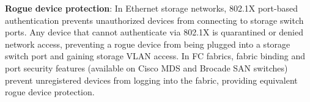 \textbf{Rogue device protection}: In Ethernet storage networks, 802.1X port-based authentication prevents unauthorized devices from connecting to storage switch ports. Any device that cannot authenticate via 802.1X is quarantined or denied network access, preventing a rogue device from being plugged into a storage switch port and gaining storage VLAN access. In FC fabrics, fabric binding and port security features (available on Cisco MDS and Brocade SAN switches) prevent unregistered devices from logging into the fabric, providing equivalent rogue device protection.

